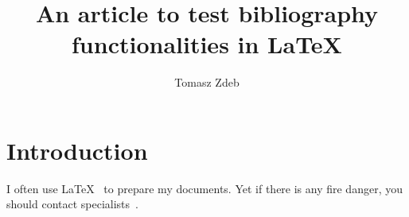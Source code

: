 \documentclass{article}
\title{An article to test bibliography functionalities in \LaTeX}
\author{Tomasz Zdeb}
\date{}
\begin{document}
\maketitle

\section{Introduction}

I often use \LaTeX~\cite{latex} to prepare my documents. Yet if there is any fire danger, you should contact specialists~\cite{pato}.




\end{document}
